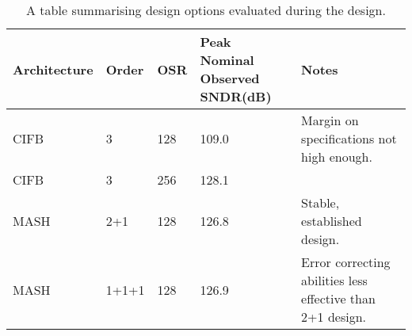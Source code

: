 \begin{table}
    \begin{center}
    \caption{A table summarising design options evaluated during the design.}
    \label{tab:modoptions}
    \begin{tabular}{l l l p{} p{}}
    \toprule
    Architecture  & Order &   OSR     & Peak Nominal Observed SNDR(dB) & Notes \\
    \midrule
    CIFB & 3     & 128 & 109.0 & Margin on specifications not high enough. \\
    CIFB & 3     & 256 & 128.1 & \\
    MASH & 2+1   & 128 & 126.8 & Stable, established design. \\
    MASH & 1+1+1 & 128 & 126.9 & Error correcting abilities less effective than 2+1 design. \\
    \end{tabular}
    \end{center}
\end{table}
